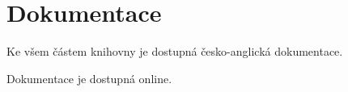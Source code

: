 \chapter{Dokumentace}

Ke všem částem knihovny je dostupná česko-anglická dokumentace.

Dokumentace je dostupná online\cite{dokumentace}.

